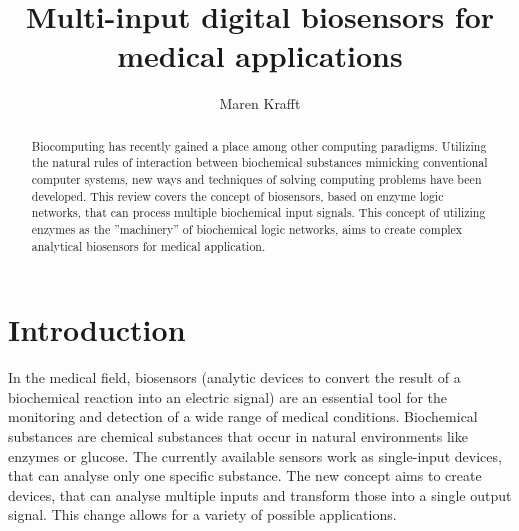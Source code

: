 \documentclass[runningheads]{llncs}
\begin{document}
\pagestyle{empty}
\title{Multi-input digital biosensors for medical applications}
\author{Maren Krafft}
\maketitle        

      
\begin{abstract}
Biocomputing has recently gained a place among other computing paradigms. Utilizing the natural rules of interaction between biochemical substances mimicking conventional computer systems, new ways and techniques of solving computing problems have been developed. This review covers the concept of biosensors, based on enzyme logic networks, that can process multiple biochemical input signals. This concept of utilizing enzymes as the ''machinery'' of biochemical logic networks, aims to create complex analytical biosensors for medical application.


\end{abstract}


\section{Introduction}

	In the medical field, biosensors (analytic devices to convert the result of a biochemical reaction into an electric signal) are an essential tool for the monitoring and detection of a wide range of medical conditions. Biochemical substances are chemical substances that occur in natural environments like enzymes or glucose. The currently available sensors work as single-input devices, that can analyse only one specific substance. The new concept aims to create devices, that can analyse multiple inputs and transform those into a single output signal. This change allows for a variety of possible applications. \cite{biosensors,definitions}\\
	
\end{document}
